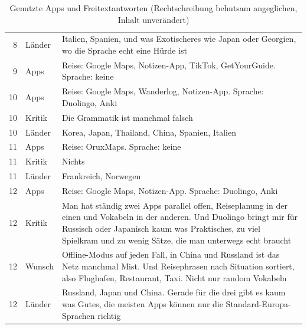 \documentclass[12pt,a4paper]{scrreprt}
\begin{document}
\begin{table}[!htb]
\begin{tabular}{r>{\raggedright\arraybackslash}p{1.6cm}>{\raggedright\arraybackslash}p{11.6cm}}
        8 & Länder & Italien, Spanien, und was Exotischeres wie Japan oder Georgien, wo die Sprache echt eine Hürde ist \\
        9 & Apps & Reise: Google Maps, Notizen-App, TikTok, GetYourGuide. Sprache: keine \\
        10 & Apps & Reise: Google Maps, Wanderlog, Notizen-App. Sprache: Duolingo, Anki \\
        10 & Kritik & Die Grammatik ist manchmal falsch \\
        10 & Länder & Korea, Japan, Thailand, China, Spanien, Italien \\
        11 & Apps & Reise: OruxMaps. Sprache: keine \\
        11 & Kritik & Nichts \\
        11 & Länder & Frankreich, Norwegen \\
        12 & Apps & Reise: Google Maps, Notizen-App. Sprache: Duolingo, Anki \\
        12 & Kritik & Man hat ständig zwei Apps parallel offen, Reiseplanung in der einen und Vokabeln in der anderen. Und Duolingo bringt mir für Russisch oder Japanisch kaum was Praktisches, zu viel Spielkram und zu wenig Sätze, die man unterwegs echt braucht \\
        12 & Wunsch & Offline-Modus auf jeden Fall, in China und Russland ist das Netz manchmal Mist. Und Reisephrasen nach Situation sortiert, also Flughafen, Restaurant, Taxi. Nicht nur random Vokabeln \\
        12 & Länder & Russland, Japan und China. Gerade für die drei gibt es kaum was Gutes, die meisten Apps können nur die Standard-Europa-Sprachen richtig \\
        \bottomrule
    \end{tabular}
    \caption{Genutzte Apps und Freitextantworten (Rechtschreibung behutsam angeglichen, Inhalt unverändert)}
    \label{tab:freitext}
\end{table}
\end{document}
